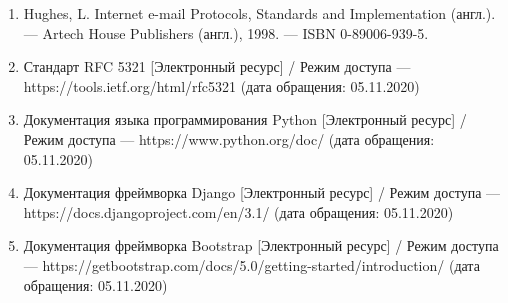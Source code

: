 


\begin{enumerate}
	\item Hughes, L. Internet e-mail Protocols, Standards and Implementation (англ.). — Artech House Publishers (англ.), 1998. — ISBN 0-89006-939-5.
	\item Стандарт RFC 5321 [Электронный ресурс] / Режим доступа --- https://tools.ietf.org/html/rfc5321 (дата обращения: 05.11.2020)
	\item Документация языка программирования Python [Электронный ресурс] / Режим доступа --- https://www.python.org/doc/ (дата обращения: 05.11.2020)
	\item Документация фреймворка Django [Электронный ресурс] / Режим доступа --- https://docs.djangoproject.com/en/3.1/ (дата обращения: 05.11.2020)
	\item Документация фреймворка Bootstrap [Электронный ресурс] / Режим доступа ---	https://getbootstrap.com/docs/5.0/getting-started/introduction/ (дата обращения: 05.11.2020)
\end{enumerate}
